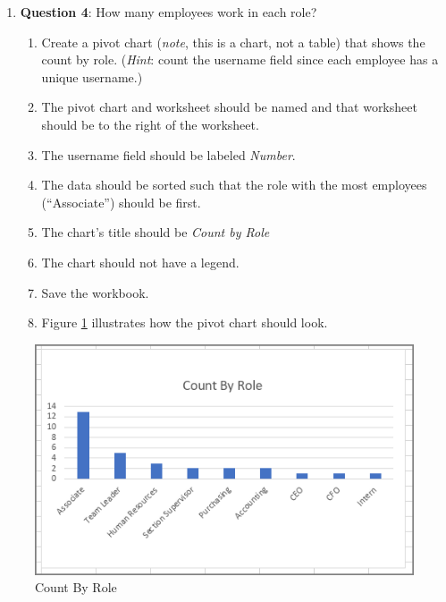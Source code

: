 \begin{enumerate}[resume]
	\item{\textbf{Question 4}: How many employees work in each role?}
	
	\begin{enumerate}
		\item Create a pivot chart (\textit{note}, this is a chart, not a table) that shows the count by role. (\textit{Hint}: count the username field since each employee has a unique username.)
		\item The pivot chart and worksheet should be named  and that worksheet should be to the right of the  worksheet.
		\item The username field should be labeled \textit{Number}.
		\item The data should be sorted such that the role with the most employees (``Associate'') should be first.
		\item The chart's title should be \textit{Count by Role}
		\item The chart should not have a legend.
		\item Save the  workbook.
		\item Figure \ref{07:fig61} illustrates how the pivot chart should look.
	\end{enumerate}
	
\end{enumerate}

\begin{figure}[H]
	\centering
	\includegraphics[width=\maxwidth{.95\linewidth}]{gfx/ch07_fig61}
	\caption{Count By Role}
	\label{07:fig61}
\end{figure}

